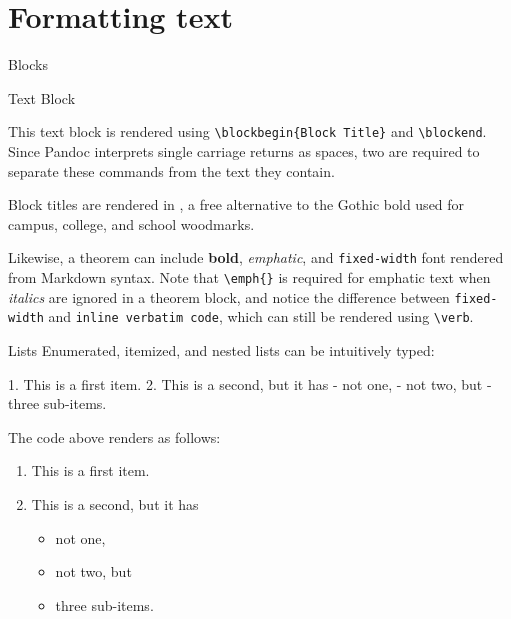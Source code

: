 \documentclass[
  ignorenonframetext,
  aspectratio=169,
]{beamer}
\newenvironment{Shaded}{}{}
\newcommand{\NormalTok}[1]{#1}
\newcommand{\SpecialStringTok}[1]{\textcolor[rgb]{0.73,0.40,0.53}{#1}}
\providecommand{\tightlist}{%
  \setlength{\itemsep}{0pt}\setlength{\parskip}{0pt}}
\newcommand{\blockbegin}[1]{\begin{block}{#1}}
\newcommand{\blockend}{\end{block}}
\newcommand{\theorembegin}[1]{\begin{theorem}{#1}}
\newcommand{\theoremend}{\end{theorem}}
\begin{document}
\hypertarget{formatting-text}{%
\section{Formatting text}\label{formatting-text}}

\begin{frame}[fragile]{Blocks}
\protect\hypertarget{blocks}{}
\blockbegin{Text Block}

This text block is rendered using \verb|\blockbegin{Block Title}| and
\verb|\blockend|. Since Pandoc interprets single carriage returns as
spaces, two are required to separate these commands from the text they
contain.

Block titles are rendered in , a free
alternative to the Gothic bold used for campus, college, and school
woodmarks.

\blockend

\theorembegin

Likewise, a theorem can include \textbf{bold}, \emph{emphatic}, and
\texttt{fixed-width} font rendered from Markdown syntax. Note that
\verb|\emph{}| is required for emphatic text when \emph{italics} are
ignored in a theorem block, and notice the difference between
\texttt{fixed-width} and \verb|inline verbatim code|, which can still be
rendered using \verb|\verb|.

\theoremend
\end{frame}

\begin{frame}[fragile]{Lists}
\protect\hypertarget{lists}{}
Enumerated, itemized, and nested lists can be intuitively typed:

\begin{Shaded}
\begin{Highlighting}[]
\SpecialStringTok{1. }\NormalTok{This is a first item.}
\SpecialStringTok{2. }\NormalTok{This is a second, but it has}
\SpecialStringTok{    {-} }\NormalTok{not one,}
\SpecialStringTok{    {-} }\NormalTok{not two, but}
\SpecialStringTok{    {-} }\NormalTok{three sub{-}items.}
\end{Highlighting}
\end{Shaded}

The code above renders as follows:

\begin{enumerate}
\tightlist
\item
  This is a first item.
\item
  This is a second, but it has

  \begin{itemize}
  \tightlist
  \item
    not one,
  \item
    not two, but
  \item
    three sub-items.
  \end{itemize}
\end{enumerate}
\end{frame}
\end{document}
